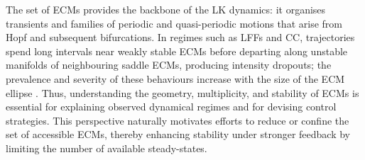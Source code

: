 The set of ECMs provides the backbone of the LK dynamics: it organises transients and families of periodic and quasi-periodic motions that arise from Hopf and subsequent bifurcations.
In regimes such as LFFs and CC, trajectories spend long intervals near weakly stable ECMs before departing along unstable manifolds of neighbouring saddle ECMs, producing intensity dropouts; the prevalence and severity of these behaviours increase with the size of the ECM ellipse \cite{heil2003delay, krauskopf2004dynamics}.
Thus, understanding the geometry, multiplicity, and stability of ECMs is essential for explaining observed dynamical regimes and for devising control strategies.
This perspective naturally motivates efforts to reduce or confine the set of accessible ECMs, thereby enhancing stability under stronger feedback by limiting the number of available steady-states.
%
%
